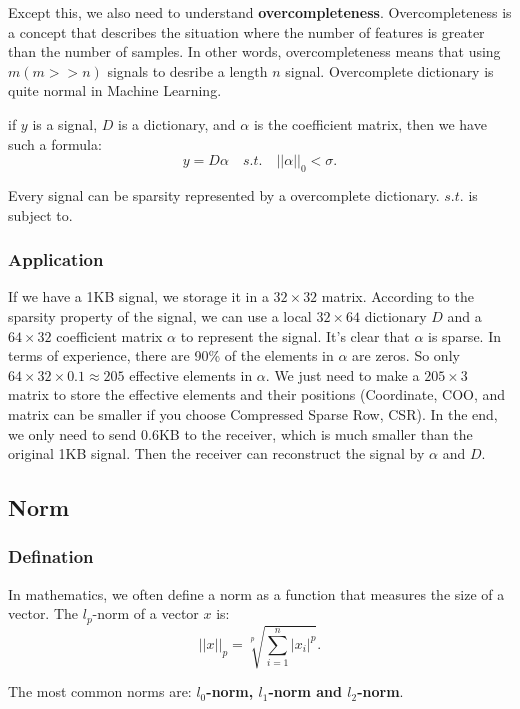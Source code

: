 \documentclass[12pt]{ctexart}
\begin{document}
Except this, we also need to understand \textbf{overcompleteness}. Overcompleteness is a
concept that describes the situation where the number of features is greater than the
number of samples. In other words, overcompleteness means that using $m (m>>n)$ signals
to desribe a length $n$ signal. Overcomplete dictionary is quite normal in Machine Learning.

if $y$ is a signal, $D$ is a dictionary, and $\alpha$ is the coefficient matrix, then we have
such a formula:
\[
  y = D\alpha \quad s.t. \quad ||\alpha||_0 < \sigma.
\]

Every signal can be sparsity represented by a overcomplete dictionary. $s.t.$ is subject to.


\subsubsection{\textbf{Application}}

If we have a 1KB signal, we storage it in a $ 32 \times 32$ matrix. According to the sparsity
property of the signal, we can use a local $32 \times 64$ dictionary $D$ and a $64 \times
32$ coefficient matrix $\alpha$ to represent the signal. It's clear that $\alpha$ is sparse.
In terms of experience, there are 90\% of the elements in $\alpha$ are zeros. So only
$64 \times 32 \times 0.1 \approx 205$ effective elements in $\alpha$. We just need to
make a $205 \times 3$ matrix to store the effective elements and their positions (Coordinate,
COO, and matrix can be smaller if you choose Compressed Sparse Row, CSR). In the end, we only
need to send 0.6KB to the receiver, which is much smaller than the original 1KB signal. Then
the receiver can reconstruct the signal by $\alpha$ and $D$.

\subsection{\textbf{Norm}}

\subsubsection{\textbf{Defination}}

In mathematics, we often define a norm as a function that measures the size of a vector.
The $l_p$-norm of a vector $x$ is:
\[
  ||x||_p = \sqrt[p]{\sum_{i=1}^{n} |x_i|^p}.
\]

The most common norms are: \textbf{$l_0$-norm, $l_1$-norm and $l_2$-norm}.
\end{document}
